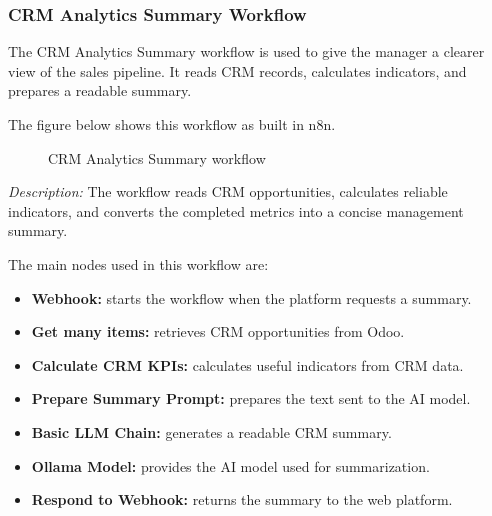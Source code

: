 \documentclass[12pt,a4paper,oneside]{report}
\newcommand{\figdesc}[1]{%
\vspace{-0.05cm}\noindent\small\textit{Description:} #1\par\normalsize\vspace{0.30cm}%
}
\begin{document}
\subsubsection{CRM Analytics Summary Workflow}

The CRM Analytics Summary workflow is used to give the manager a clearer view of the sales pipeline. It reads CRM records, calculates indicators, and prepares a readable summary.

The figure below shows this workflow as built in n8n.

\begin{figure}[H]
\centering
{}
\caption{CRM Analytics Summary workflow}
\label{fig:crm analytics workflow}
\end{figure}
\figdesc{The workflow reads CRM opportunities, calculates reliable indicators, and converts the completed metrics into a concise management summary.}

The main nodes used in this workflow are:

\begin{itemize}
\item \textbf{Webhook:} starts the workflow when the platform requests a summary.
\item \textbf{Get many items:} retrieves CRM opportunities from Odoo.
\item \textbf{Calculate CRM KPIs:} calculates useful indicators from CRM data.
\item \textbf{Prepare Summary Prompt:} prepares the text sent to the AI model.
\item \textbf{Basic LLM Chain:} generates a readable CRM summary.
\item \textbf{Ollama Model:} provides the AI model used for summarization.
\item \textbf{Respond to Webhook:} returns the summary to the web platform.
\end{itemize}
\end{document}
